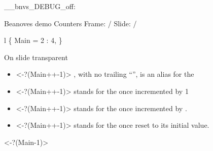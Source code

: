 \documentclass{beamer}
\begin{document}
\ExplSyntaxOn
\__bnvs_DEBUG_off:
\ExplSyntaxOff
\begin{frame}
{Beanoves demo}
{\large Counters}
Frame: \insertframenumber /
Slide: \insertslidenumber /
\begin{myCodeBox}{l}%
\string\Beanoves \{
  Main = 2 : 4,
\}
\end{myCodeBox}
On slide transparent
\begin{itemize}
\item
\only<-?(Main++-1)>{}%
, with no trailing ``'', is an alias for the 
\item
\only<-?(Main++-1)>{}%
 stands for the  once incremented by 1
\item
\only<-?(Main++-1)>{}%
 stands for the  once incremented by .
\item
\only<-?(Main++-1)>{}%
 stands for the  once reset to its initial value.
\end{itemize}
\only<-?(Main-1)>{}
\end{frame}
\end{document}
